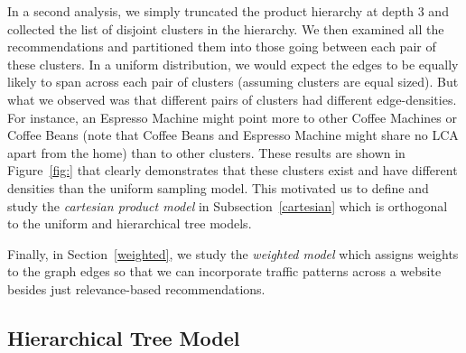 In a second analysis, we simply truncated the product hierarchy
at depth 3 and collected the list of disjoint clusters in the hierarchy. We
then examined all the recommendations and partitioned them into those going between each pair of these clusters. In a uniform distribution, we would expect the
edges to be equally likely to span across each pair of clusters
(assuming clusters are equal sized). But what we observed was that
different pairs of clusters had different edge-densities. For instance, an Espresso Machine might point more to other Coffee Machines or
Coffee Beans (note that Coffee Beans and Espresso Machine might share
no LCA apart from the home) than to other clusters. These results are
shown in Figure~\ref{fig:} that clearly demonstrates that these
clusters exist and have different densities than the uniform sampling model. This
motivated us to define and study the {\em cartesian product model} in
Subsection~\ref{cartesian} which is orthogonal to the uniform and
hierarchical tree models.

Finally, in Section~\ref{weighted}, we study the {\em weighted model}
which assigns weights to the graph edges so that we can incorporate traffic
patterns across a website besides just relevance-based recommendations.

\subsection{Hierarchical Tree Model}
\label{hierarchy}

